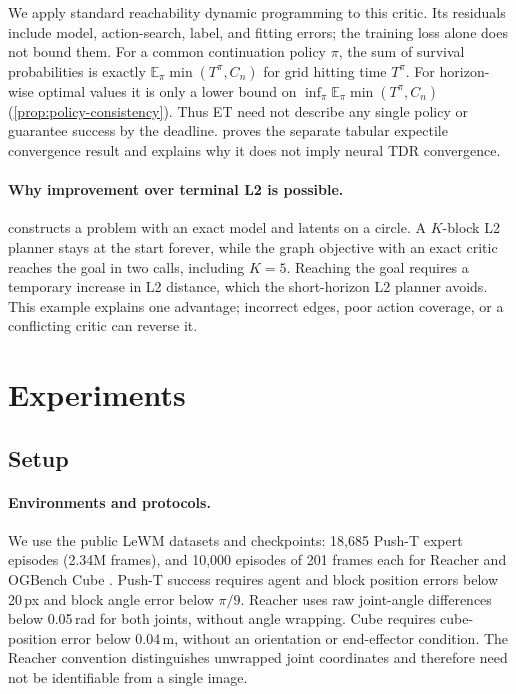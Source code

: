 \documentclass{article}
\newcommand{\EE}{\mathbb E}
\theoremstyle{definition}
\theoremstyle{remark}
\begin{document}
We apply standard reachability dynamic programming \citep{abate2008} to this critic.
Its residuals include model, action-search, label, and fitting errors; the training loss
alone does not bound them. For a common continuation policy $\pi$, the sum of survival
probabilities is exactly $\EE_\pi\min(T^\pi,C_n)$ for grid hitting time $T^\pi$.
For horizon-wise optimal values it is only a lower bound on
$\inf_\pi\EE_\pi\min(T^\pi,C_n)$ (\cref{prop:policy-consistency}).
Thus ET need not describe any single policy or guarantee success by the deadline.
 proves the separate tabular expectile convergence result and explains
why it does not imply neural TDR convergence.

\paragraph{Why improvement over terminal L2 is possible.}
 constructs a problem with an exact model and latents on a circle.
A $K$-block L2 planner stays at the start forever, while the graph objective with an exact
critic reaches the goal in two calls, including $K=5$. Reaching the goal requires a temporary
increase in L2 distance, which the short-horizon L2 planner avoids. This example explains
one advantage; incorrect edges, poor action coverage, or a conflicting critic can reverse it.

\section{Experiments}
\label{sec:experiments}
\subsection{Setup}
\label{sec:setup}
\paragraph{Environments and protocols.}
We use the public LeWM datasets and checkpoints: 18,685 Push-T expert episodes
(2.34M frames), and 10,000 episodes of 201 frames each for Reacher and OGBench Cube
\citep{lewm,ogbench}. Push-T success requires agent and block position errors below
20\,px and block angle error below $\pi/9$. Reacher uses raw joint-angle differences
below 0.05\,rad for both joints, without angle wrapping. Cube requires cube-position
error below 0.04\,m, without an orientation or end-effector condition.
The Reacher convention distinguishes unwrapped joint coordinates and therefore need not
be identifiable from a single image.
\end{document}
